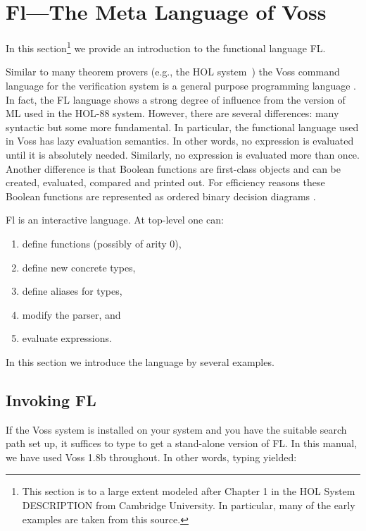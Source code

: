 \section{Fl---The Meta Language of Voss}

In this section\footnote{This section is to a large extent modeled
after Chapter 1 in the HOL System DESCRIPTION from Cambridge University.
In particular, many of the early examples are taken from this source.}
we provide an introduction to the functional language FL.

Similar to many theorem provers (e.g., the HOL%
%
{}
system~\cite{HOLsystem,HOLbook}) the
Voss command language for the verification system is a general
purpose programming language%
%
{}.
In fact, the FL language shows a strong degree of influence from
the version of ML%
%
{} used in the HOL-88%
%
{} system.
However, there are several differences:  many syntactic but some
more fundamental.
In particular, the functional language used in Voss has lazy evaluation
semantics.
In other words, no expression is evaluated until it is
absolutely needed.
Similarly, no expression is evaluated more than once.
Another difference is that Boolean functions are first-class
objects and can be created, evaluated, compared and printed out.
For efficiency reasons these Boolean functions are represented as
ordered binary decision diagrams%
%
{}. 

Fl is an interactive language.
At top-level one can:
\begin{enumerate}
\item define functions (possibly of arity 0),
\item define new concrete types,
\item define aliases for types,
\item modify the parser, and
\item evaluate expressions.
\end{enumerate}
In this section we introduce the language by several examples.

\subsection{Invoking FL}

If the Voss system is installed on your system
and you have the suitable search path set up, it suffices
to type \verb@fl@ to get a stand-alone version of FL. In this manual, we
have used Voss 1.8b throughout. In other words, typing \verb@fl@ yielded:

